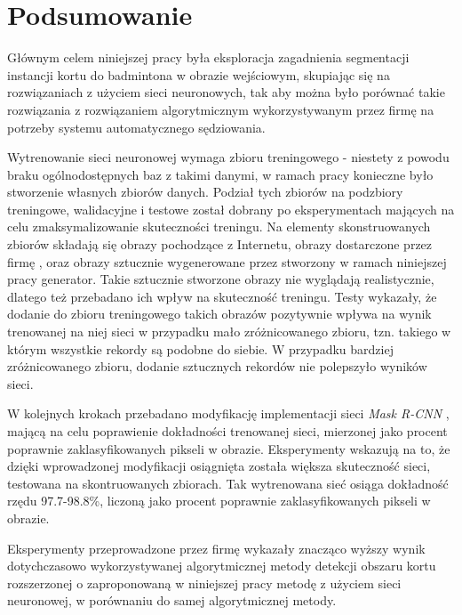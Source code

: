 \chapter{Podsumowanie}

Głównym celem niniejszej pracy była eksploracja zagadnienia segmentacji instancji kortu do badmintona w obrazie wejściowym, skupiając się na rozwiązaniach z użyciem sieci neuronowych, tak aby można było porównać takie rozwiązania z rozwiązaniem algorytmicznym wykorzystywanym przez firmę \blue{} na potrzeby systemu automatycznego sędziowania.

Wytrenowanie sieci neuronowej wymaga zbioru treningowego - niestety z powodu braku ogólnodostępnych baz z takimi danymi, w ramach pracy konieczne było stworzenie własnych zbiorów danych. Podział tych zbiorów na podzbiory treningowe, walidacyjne i testowe został dobrany po eksperymentach mających na celu zmaksymalizowanie skuteczności treningu. Na elementy skonstruowanych zbiorów składają się obrazy pochodzące z Internetu, obrazy dostarczone przez firmę \blue{}, oraz obrazy sztucznie wygenerowane przez stworzony w ramach niniejszej pracy generator. Takie sztucznie stworzone obrazy nie wyglądają realistycznie, dlatego też przebadano ich wpływ na skuteczność treningu. Testy wykazały, że dodanie do zbioru treningowego takich obrazów pozytywnie wpływa na wynik trenowanej na niej sieci w przypadku mało zróżnicowanego zbioru, tzn. takiego w którym wszystkie rekordy są podobne do siebie. W przypadku bardziej zróżnicowanego zbioru, dodanie sztucznych rekordów nie polepszyło wyników sieci.

W kolejnych krokach przebadano modyfikację implementacji sieci \textit{Mask R-CNN} \cite{matterport-mask-rcnn}, mającą na celu poprawienie dokładności trenowanej sieci, mierzonej jako procent poprawnie zaklasyfikowanych pikseli w obrazie. Eksperymenty wskazują na to, że dzięki wprowadzonej modyfikacji osiągnięta została większa skuteczność sieci, testowana na skontruowanych zbiorach. Tak wytrenowana sieć osiąga dokładność rzędu 97.7-98.8\%, liczoną jako procent poprawnie zaklasyfikowanych pikseli w obrazie. 

Eksperymenty przeprowadzone przez firmę \blue{} wykazały znacząco wyższy wynik dotychczasowo wykorzystywanej algorytmicznej metody detekcji obszaru kortu rozszerzonej o zaproponowaną w niniejszej pracy metodę z użyciem sieci neuronowej, w porównaniu do samej algorytmicznej metody.

